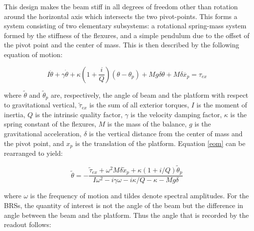 \documentclass [12pt, proquest]{uwthesis}[2019]
\begin{document}
This design makes the beam stiff in all degrees of freedom other than rotation around the horizontal axis which intersects the two pivot-points. This forms a system consisting of two elementary subsystems: a rotational spring-mass system formed by the stiffness of the flexures, and a simple pendulum due to the offset of the pivot point and the center of mass. This is then described by the following equation of motion: \cite{venk2014}

\begin{equation}
I \ddot{\theta}+ \gamma \dot{\theta}+\kappa (1+ \frac{i}{Q})(\theta-\theta_p)+M g \delta \theta +M \delta \ddot{x_p}=\tau_{ex} \label{eom}
\end{equation}

where $\tilde{\theta}$ and $\tilde{\theta}_p$ are, respectively, the angle of beam and the platform with respect to gravitational vertical, $\tilde{\tau}_{ex}$ is the sum of all exterior torques, $I$ is the moment of inertia, $Q$ is the intrinsic quality factor, $\gamma$ is the velocity damping factor, $\kappa$ is the spring constant of the flexures, $M$ is the mass of the balance, $g$ is the gravitational acceleration, $\delta$ is the vertical distance from the center of mass and the pivot point, and $x_p$ is the translation of the platform. Equation \ref{eom} can be rearranged to yield:

\begin{equation}
\tilde{\theta} = -\frac{\tilde{\tau}_{ex}+\omega^2 M \delta \tilde{x}_p+\kappa (1+i/Q) \tilde{\theta}_p}{I\omega^2-i \gamma \omega -i \kappa /Q-\kappa -Mg\delta}
\end{equation}

where $\omega$ is the frequency of motion and tildes denote spectral amplitudes. For the BRSs, the quantity of interest is not the angle of the beam but the difference in angle between the beam and the platform. Thus the angle that is recorded by the readout follows:
\end{document}
